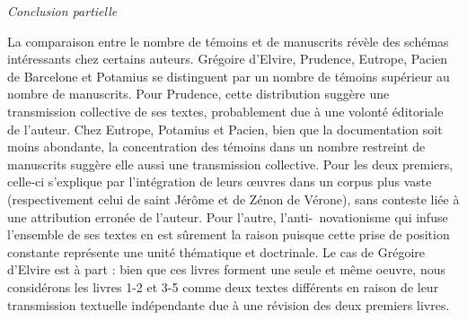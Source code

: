 \documentclass[a4paper,twoside,12pt]{book}
\begin{document}
\begin{center}
	\textit{Conclusion partielle}
\end{center}

La comparaison entre le nombre de témoins et de manuscrits  révèle des schémas intéressants chez certains auteurs. Grégoire d'Elvire, Prudence, Eutrope,  Pacien de Barcelone et Potamius se distinguent par un nombre de témoins  supérieur au nombre de manuscrits. Pour Prudence, cette distribution suggère une transmission collective de ses textes, probablement due à une volonté éditoriale de l'auteur. Chez Eutrope, Potamius et Pacien, bien que la documentation soit moins abondante, la concentration des témoins dans un nombre restreint de manuscrits suggère elle aussi une transmission collective. Pour les deux premiers, celle-ci s’explique par l’intégration de leurs œuvres dans un corpus plus vaste (respectivement celui de saint Jérôme et de Zénon de Vérone), sans conteste liée à une attribution erronée de l’auteur. Pour l'autre, l'anti-~novationisme qui infuse l'ensemble de ses textes en est sûrement la raison puisque cette prise de position constante représente une unité thématique et doctrinale. Le cas de Grégoire d'Elvire est à part : bien que ces livres forment une seule et même oeuvre, nous considérons les livres 1-2 et 3-5 comme deux textes différents en raison de leur transmission textuelle indépendante due à une révision des deux premiers livres.
\end{document}
